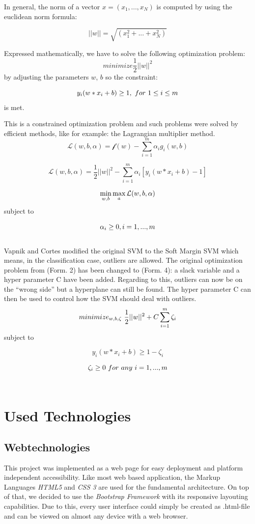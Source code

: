 \documentclass{scrartcl}
\begin{document}
In general, the norm of a vector $x = (x_1,...,x_N)$ is computed by using the euclidean norm formula: 

\[||w||=\sqrt{(x_{1}^{2}+...+x_{N}^{2})}\]

Expressed mathematically, we have to solve the following optimization problem: 
\[minimize \frac{1}{2}||w||^{2} \]
by adjusting the parameters $w$, $b$ so the constraint:

\[y_{i}(w * x_{i} + b) \geq 1,~ \space for~ \space 1 \leq i \leq m \] is met.


This is a constrained optimization problem and such problems were solved by efficient methods, like for example: the Lagrangian multiplier method.\\

\[
	\mathcal{L}(w,b,\alpha) = \mathcal{f}(w)-\sum_{i=1}^{m}\alpha_{i}g_{i}(w,b)
\]

\[
	\mathcal{L}(w,b,\alpha) = \frac{1}{2}||w||^{2}-\sum_{i=1}^{m}\alpha_{i}[y_{i}(w*x_{i}+b)-1]
\]

\[
	\min_{w,b} \space \max_{a} \mathcal{L}(w,b,\alpha)
\]
subject to

\[
	\alpha_{i}\geq0, \space i=1,...,m \label{ref4}
\]
\\
Vapnik and Cortes modified the original SVM to the Soft Margin SVM which means, in the classification case, outliers are allowed. The original optimization problem from (Form. 2) has been changed to (Form. 4): a slack variable and a hyper parameter C have been added. Regarding to this, outliers can now be on the “wrong side” but a hyperplane can still be found. The hyper parameter C can then be used to control how the SVM should deal with outliers. \\

\[
	minimize_{w,b,\zeta}~ \space \frac{1}{2}||w||^{2} + C \sum_{i=1}^{m} \zeta_{i} \label{ref8}
\]
subject to

\[
	y_{i}(w*x_{i}+b) \geq 1-\zeta_{i}
\]

\[
	\zeta_{i} \geq 0~ \space for~ \space any~ \space i=1,...,m
\]
\\


\section{Used Technologies}

\subsection{Webtechnologies}
This project was implemented as a web page for easy deployment and platform independent accessibility. Like most web based application, the Markup Languages \textit{HTML5} and \textit{CSS 3} are used for the fundamental architecture. On top of that, we decided to use the \textit{Bootstrap Framework} with its responsive layouting capabilities. Due to this, every user interface could simply be created as .html-file and can be viewed on almost any device with a web browser.\\
\end{document}
